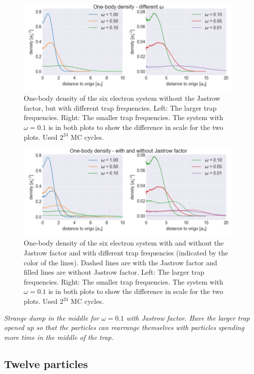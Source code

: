 \begin{figure}[H]
\center
\includegraphics[width=0.85\linewidth]{../Results/one_body_density_no_interaction_6p}\caption{One-body density of the six electron system without the Jastrow factor, but with different trap frequencies. Left: The larger trap frequencies. Right: The smaller trap frequencies. The system with $\omega = 0.1$ is in both plots to show the difference in scale for the two plots. Used $2^{24}$ MC cycles.}\label{fig:one_body_density_no_interaction_6p}
\end{figure}

\begin{figure}[H]
\center
\includegraphics[width=0.85\linewidth]{../Results/one_body_density_interaction_6p}\caption{One-body density of the six electron system with and without the Jastrow factor and with different trap frequencies (indicated by the color of the lines). Dashed lines are with the Jastrow factor and filled lines are without Jastrow factor. Left: The larger trap frequencies. Right: The smaller trap frequencies.  The system with $\omega = 0.1$ is in both plots to show the difference in scale for the two plots. Used $2^{24}$ MC cycles. }\label{fig:one_body_density_interaction_6p}
\end{figure}

\textit{Strange dump in the middle for $\omega = 0.1$ with Jastrow factor. Have the larger trap opened up so that the particles can rearrange themselves with particles spending more time in the middle of the trap. }

\subsection{Twelve particles}

